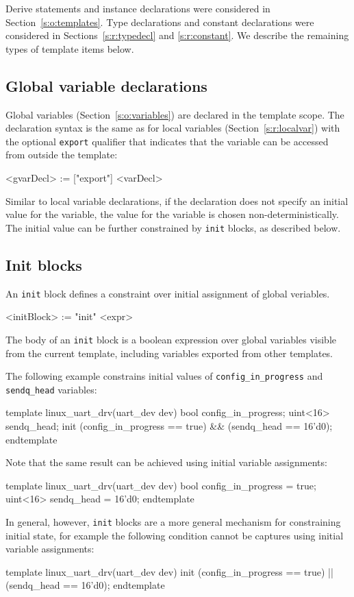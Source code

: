 \documentclass{report}
\newcommand{\src}[1]{\texttt{#1}}
\begin{document}
Derive statements and instance declarations were considered in 
Section~\ref{s:o:templates}.  Type declarations and constant 
declarations were considered in Sections~\ref{s:r:typedecl} and
\ref{s:r:constant}.  We describe the remaining types of template 
items below.

\subsection{Global variable declarations}

Global variables (Section~\ref{s:o:variables}) are declared in the 
template scope.  The declaration syntax is the same as for local 
variables (Section~\ref{s:r:localvar}) with the optional 
\src{export} qualifier that indicates that the variable can be 
accessed from outside the template:

\begin{bnflisting}{}
<gvarDecl> := ["export"] <varDecl>
\end{bnflisting}

Similar to local variable declarations, if the declaration does 
not specify an initial value for the variable, the value for the 
variable is chosen non-deterministically.  The initial value can 
be further constrained by \src{init} blocks, as described below.

\subsection{Init blocks}

An \src{init} block defines a constraint over initial assignment 
of global veriables.
\begin{bnflisting}{}
<initBlock> := "init" <expr>
\end{bnflisting}
The body of an \src{init} block is a boolean expression over 
global variables visible from the current template, including 
variables exported from other templates.  

The following example constrains initial values of 
\src{config\_in\_progress} and \src{sendq\_head} variables:
\begin{tsllisting}{}
template linux_uart_drv(uart_dev dev)
    bool config_in_progress;
    uint<16> sendq_head;
    init (config_in_progress == true) &&
         (sendq_head == 16'd0);
endtemplate
\end{tsllisting}
Note that the same result can be achieved using initial variable 
assignments:
\begin{tsllisting}{}
template linux_uart_drv(uart_dev dev)
    bool config_in_progress = true;
    uint<16> sendq_head = 16'd0;
endtemplate
\end{tsllisting}
In general, however, \src{init} blocks are a more general 
mechanism for constraining initial state, for example the 
following condition cannot be captures using initial variable 
assignments:
\begin{tsllisting}{}
template linux_uart_drv(uart_dev dev)
    init (config_in_progress == true) ||
         (sendq_head == 16'd0);
endtemplate
\end{tsllisting}
\end{document}
